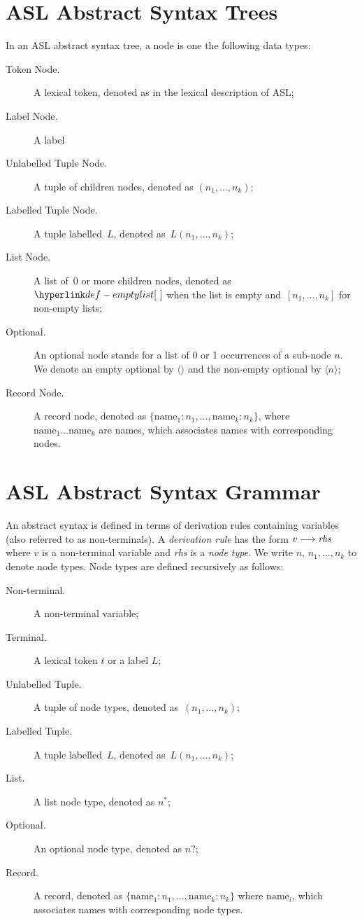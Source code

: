 \section{ASL Abstract Syntax Trees \label{sec:ASLAbstractSyntaxTrees}}

In an ASL abstract syntax tree, a node is one the following data types:
\begin{description}
\item[Token Node.] A lexical token, denoted as in the lexical description of ASL;
\item[Label Node.] A label
\item[Unlabelled Tuple Node.] A tuple of children nodes, denoted as $(n_1,\ldots,n_k)$;
\item[Labelled Tuple Node.] A tuple labelled~$L$, denoted as~$L(n_1,\ldots,n_k)$;
\item[List Node.] A list of~$0$ or more children nodes, denoted as~$\emptylist$
      when the list is empty and~$[n_1,\ldots,n_k]$ for non-empty lists;
\item[Optional.] An optional node stands for a list of 0 or 1 occurrences of a sub-node $n$. We denote an empty optional by $\langle\rangle$ and the non-empty optional by $\langle n \rangle$;
\item[Record Node.] A record node, denoted as $\{\text{name}_1 : n_1,\ldots,\text{name}_k : n_k\}$, where \\
      $\text{name}_1 \ldots \text{name}_k$ are names, which associates names with corresponding nodes.
\end{description}

\newpage

\section{ASL Abstract Syntax Grammar \label{sec:ASLAbstractSyntaxGrammar}}

An abstract syntax is defined in terms of derivation rules containing variables (also referred to as non-terminals).
%
A \emph{derivation rule} has the form $v \longrightarrow \textit{rhs}$ where $v$ is a non-terminal variable and \textit{rhs} is a \emph{node type}. We write $n$, $n_1,\ldots,n_k$ to denote node types.
%
Node types are defined recursively as follows:
\begin{description}
\item[Non-terminal.] A non-terminal variable;
\item[Terminal.] A lexical token $t$ or a label $L$;
\item[Unlabelled Tuple.] A tuple of node types, denoted as~$(n_1,\ldots,n_k)$;
\item[Labelled Tuple.] A tuple labelled~$L$, denoted as~$L(n_1,\ldots,n_k)$;
\item[List.] A list node type, denoted as $n^{*}$;
\item[Optional.] An optional node type, denoted as $n?$;
\item[Record.] A record, denoted as $\{\text{name}_1 : n_1,\ldots,\text{name}_k : n_k\}$ where $\text{name}_i$, which associates names with corresponding node types.
\end{description}

